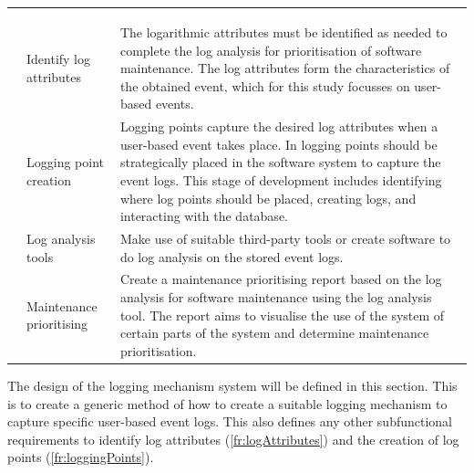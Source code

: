 \setcounter{phase}{0}
\begin{xltabular}{\textwidth}{llX}
	\caption[Functional requirements of the solution]{\textit{Functional requirements of the solution}}\label{tbl:ch2_developmenetRequirements} \\ 
	\toprule
	 &  &  \\
	\midrule
	\endfirsthead

	\caption[]{\continueCaption} \\
	\toprule
	 &  &  \\
	\midrule
	\endhead

	\midrule
	 \\ 
	\endfoot
	\endlastfoot

	 & Identify log attributes & \RaggedRight The logarithmic attributes must be identified as needed to complete the log analysis for prioritisation of software maintenance. The log attributes form the characteristics of the obtained event, which for this study focusses on user-based events. \\

	 & Logging point creation & \RaggedRight Logging points capture the desired log attributes when a user-based event takes place. In  logging points should be strategically placed in the software system to capture the event logs. This stage of development includes identifying where log points should be placed, creating logs, and interacting with the database. \\

	 & \RaggedRight Log analysis tools & Make use of suitable third-party tools or create software to do log analysis on the stored event logs. \\

	 & \RaggedRight Maintenance prioritising & Create a maintenance prioritising report based on the log analysis for software maintenance using the log analysis tool. The report aims to visualise the use of the system of certain parts of the system and determine maintenance prioritisation. \\
	\bottomrule
\end{xltabular}

The design of the logging mechanism system will be defined in this section. This is to create a generic method of how to create a suitable logging mechanism to capture specific user-based event logs. This also defines any other subfunctional requirements to identify log attributes (\ref{fr:logAttributes}) and the creation of log points (\ref{fr:loggingPoints}).

